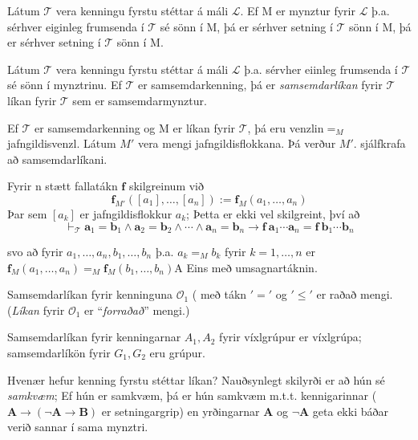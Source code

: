 \documentclass[12pt]{article}
\begin{document}
\begin{setn}[Fylgisetning]
 Látum $\mathcal{T}$ vera kenningu fyrstu stéttar á máli $\mathcal{L}$. Ef M er
 mynztur fyrir $\mathcal{L}$ þ.a. sérhver eiginleg frumsenda í $\mathcal{T}$ sé sönn
 í M, þá er sérhver setning í $\mathcal{T}$ sönn í M, þá er sérhver setning í 
 $ \mathcal{T} $ sönn í M.
\end{setn}

\begin{skgr} Látum $\mathcal{T}$ vera kenningu fyrstu stéttar á máli $\mathcal{L}$ þ.a. 
  sérvher eiinleg frumsenda í $\mathcal{T}$ sé sönn í mynztrinu. Ef $\mathcal{T}$ er samsemdarkenning,
  þá er \emph{samsemdarlíkan} fyrir $\mathcal{T}$ líkan fyrir $\mathcal{T}$ sem er 
  samsemdarmynztur.
\end{skgr}

\begin{ath}
  Ef $\mathcal{T}$ er samsemdarkenning og M er líkan fyrir $\mathcal{T}$, þá eru
  venzlin$=_{M}$ jafngildisvenzl. Látum $M'$ vera mengi jafngildisflokkana. Þá verður $M'$.
  sjálfkrafa að samsemdarlíkani.
\end{ath}

Fyrir n stætt fallatákn $\mathbf{f}$ skilgreinum við
\[\mathbf{f}_{M'}([a_1], \dotsc, [a_n]) := \mathbf{f}_{M} (a_1, \dotsc, a_n) \]
Þar sem $[a_k]$ er jafngildisflokkur $a_k$;
Þetta er ekki vel skilgreint, því að
 \[\vdash_{\mathcal{T}} \mathbf{a}_1 = \mathbf{b}_1 \wedge \mathbf{a}_2 = \mathbf{b}_2
 \wedge \dotsb \wedge \mathbf{a}_n 
= \mathbf{b}_n \rightarrow \mathbf{f}\: \mathbf{a}_1 \dotsb \mathbf{a}_n = \mathbf{f}\: \mathbf{b}_1 \dotsb \mathbf{b}_n \]

svo að fyrir $a_1, \dotsc, a_n, b_1, \dotsc, b_n$ þ.a. 
$a_k =_{M} b_k$ fyrir $k = 1, \dotsc, n$ er $\mathbf{f}_{M} (a_1, \dotsc, a_n) =_{M} \mathbf{f}_{M} (b_1, \dotsc, b_n)$A
Eins með umsagnartáknin.


\begin{daemi}
  Samsemdarlíkan fyrir kenninguna $\mathcal{O}_1$ ( með tákn $'='$ og $'\leq'$
  er raðað mengi. (\emph{Líkan} fyrir $\mathcal{O}_1$ er ``\emph{forraðað}'' mengi.)

  Samsemdarlíkan fyrir kenningarnar $A_1, A_2$
  fyrir víxlgrúpur er víxlgrúpa; samsemdarlíkön fyrir $G_1, G_2$ eru 
  grúpur.

  Hvenær hefur kenning fyrstu stéttar líkan?
  Nauðsynlegt skilyrði er að hún sé \emph{samkvæm}; Ef hún er samkvæm, þá er 
  hún samkvæm m.t.t. kennigarinnar ($\mathbf{A} \rightarrow (\lnot \mathbf{A} \rightarrow \mathbf{B})$ er setningargrip)
  en yrðingarnar $\mathbf{A}$ og $\lnot \mathbf{A}$ geta ekki báðar verið sannar í sama mynztri.
\end{daemi}
\end{document}
